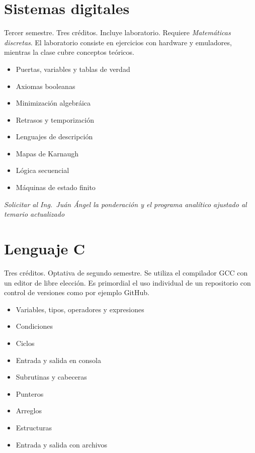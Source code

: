 \documentclass{article}
\begin{document}
\begin{multicols}{4}
\vfill\null \columnbreak

\hypertarget{sd}{\section*{Sistemas digitales}}

Tercer semestre. Tres cr\'{e}ditos. Incluye laboratorio. Requiere {\em
  Matem\'{a}ticas discretas}. El laboratorio consiste en ejercicios
con hardware y emuladores, mientras la clase cubre conceptos te\'{o}ricos.

\begin{itemize}
\item{Puertas, variables y tablas de verdad}
\item{Axiomas booleanas}
\item{Minimizaci\'{o}n algebr\'{a}ica}
\item{Retrasos y temporizaci\'{o}n}
\item{Lenguajes de descripci\'{o}n}
\item{Mapas de Karnaugh}
\item{L\'{o}gica secuencial}
\item{M\'{a}quinas de estado finito}
\end{itemize}

{\em Solicitar al Ing.\ Ju\'{a}n \'{A}ngel la ponderaci\'{o}n y el programa
  anal\'{i}tico ajustado al temario actualizado}

\newpage

\hypertarget{lac}{\section*{Lenguaje C}}

Tres cr\'{e}ditos. Optativa de segundo semestre. Se utiliza el
compilador GCC con un editor de libre elecci\'{o}n. Es primordial el
uso individual de un repositorio con control de versiones como por
ejemplo GitHub.

\begin{itemize}
\item{Variables, tipos, operadores y expresiones}
\item{Condiciones}
\item{Ciclos}
\item{Entrada y salida en consola}
\item{Subrutinas y cabeceras}
\item{Punteros}
\item{Arreglos}
\item{Estructuras}
\item{Entrada y salida con archivos}  
\end{itemize}


\end{multicols}
\end{document}
